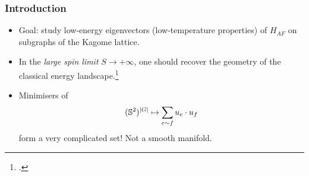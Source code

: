 \documentclass[mathserif]{beamer}
\begin{document}
\begin{frame}
\begin{center}
\begin{picture}
        \end{picture}
      \end{center}

    \end{frame}

    \begin{frame}
      \frametitle{Introduction}
      \begin{itemize}
      \item Goal: study low-energy eigenvectors (low-temperature properties) of
        $H_{AF}$ on subgraphs of the Kagome lattice.
      \item<2-> In the \emph{large spin limit} $S\to +\infty$, one
        should recover the geometry of the classical energy landscape.\footcite{doucot_semiclassical_1998}
      \item<2-> Minimisers of
        \[
          (\S^2)^{|G|} \mapsto \sum_{e\sim f}u_e\cdot u_f
        \]
        form a very complicated set! Not a smooth manifold.
      \end{itemize}
    \end{frame}
\end{document}

